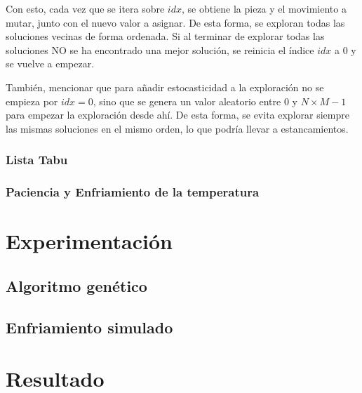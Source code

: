 \documentclass[11pt,spanish,listoffigures,listoftables]{tfgetsinf}
\begin{document}
Con esto, cada vez que se itera sobre $idx$, se obtiene la pieza y el movimiento a mutar, junto con el nuevo valor a asignar. De esta forma, se exploran todas las soluciones vecinas de forma ordenada. Si al terminar de explorar todas las soluciones NO se ha encontrado una mejor solución, se reinicia el índice $idx$ a $0$ y se vuelve a empezar.

También, mencionar que para añadir estocasticidad a la exploración no se empieza por $idx = 0$, sino que se genera un valor aleatorio entre $0$ y $N \times M - 1$ para empezar la exploración desde ahí. De esta forma, se evita explorar siempre las mismas soluciones en el mismo orden, lo que podría llevar a estancamientos.

\subsection{Lista Tabu}


\subsection{Paciencia y Enfriamiento de la temperatura}


\chapter{Experimentación}
\section{Algoritmo genético}

\section{Enfriamiento simulado}


\chapter{Resultado}

\end{document}
